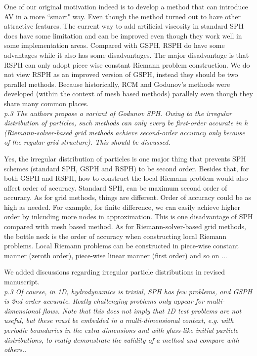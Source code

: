 \documentclass[10pt,a4paper]{article}
\begin{document}
One of our original motivation indeed is to develop a method that can introduce AV in a more ``smart" way. Even though the method turned out to have other attractive features.
The current way to add artificial viscosity in standard SPH does have some limitation and can be improved even though they work well in some implementation areas.
Compared with GSPH, RSPH do have some advantages while it also has some disadvantages. The major disadvantage is that RSPH can only adopt piece wise constant Riemann problem construction.
We do not view RSPH as an improved version of GSPH, instead they should be two parallel methods. Because historically, RCM and Godunov's methods were developed (within the context of mesh based methods) parallely even though they share many common places.
\\[3pt]

\textit{p.3 The authors propose a variant of Godunov SPH. Owing to the irregular distribution of particles, such methods can only every be first-order accurate in h (Riemann-solver-based grid methods achieve second-order accuracy only because of the regular grid structure). This should be discussed.}

Yes, the irregular distribution of particles is one  major thing that prevents SPH schemes (standard SPH, GSPH and RSPH) to be second order. Besides that, for both GSPH and RSPH, how to construct the local Riemann problem would also affect order of accuracy. 
Standard SPH, can be maximum second order of accuracy. As for grid methods, things are different. Order of accuracy could be as high as needed. For example, for finite difference, we can easily achieve higher order by inlcuding more nodes in approximation. This is one disadvantage of SPH compared with mesh based method. As for Riemann-solver-based grid methods, the bottle neck is the order of accuracy when constructing local Riemann problems. Local Riemann problems can be constructed in piece-wise constant manner (zeroth order), piece-wise linear manner (first order) and so on ...

We added discussions regarding irregular particle distributions in revised manuscript.
\\[3pt]

\textit{p.3 Of course, in 1D, hydrodynamics is trivial, SPH has few problems, and
GSPH is 2nd order accurate. Really challenging problems only appear for multi-dimensional flows. Note that this does not imply that 1D test
problems are not useful, but these must be embedded in a multi-dimensional context, e.g. with periodic boundaries in the extra dimensions and with glass-like initial particle distributions, to really
demonstrate the validity of a method and compare with others..}
\end{document}

